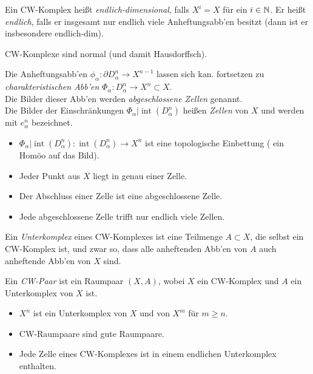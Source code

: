 \documentclass{cheat-sheet}
\DeclareMathOperator{\inte}{int} %
\begin{document}
\begin{defn}
  Ein CW-Komplex heißt \emph{endlich-dimensional}, falls $X^i = X$ für ein $i \in \mathbb{N}$. Er heißt \emph{endlich}, falls er insgesamt nur endlich viele Anheftungsabb'en besitzt (dann ist er insbesondere endlich-dim).
\end{defn}

\begin{prop}
  CW-Komplexe sind normal (und damit Hausdorffsch).
\end{prop}

\begin{defn}
  Die Anheftungsabb'en $\phi_\alpha : \partial D^{n}_\alpha \to X^{n-1}$ lassen sich kan. fortsetzen zu \emph{charakteristischen Abb'en} $\Phi_\alpha : D^n_\alpha \to X^n \subset X$.\\
  Die Bilder dieser Abb'en werden \emph{abgeschlossene Zellen} genannt.\\
  Die Bilder der Einschränkungen $\Phi_\alpha|\inte(D^n_\alpha)$ heißen \emph{Zellen} von $X$ und werden mit $e^n_\alpha$ bezeichnet.
\end{defn}

\begin{prop}
  \begin{itemize}
    \item $\Phi_\alpha|\inte(D^n_\alpha) : \inte(D^n_\alpha) \to X^n$  ist eine topologische Einbettung (\dh{} ein Homöo auf das Bild).
    \item Jeder Punkt aus $X$ liegt in genau einer Zelle.
    \item Der Abschluss einer Zelle ist eine abgeschlossene Zelle.
    \item Jede abgeschlossene Zelle trifft nur endlich viele Zellen.
  \end{itemize}
\end{prop}


\begin{defn}
  Ein \emph{Unterkomplex} eines CW-Komplexes ist eine Teilmenge $A \subset X$, die selbst ein CW-Komplex ist, und zwar so, dass alle anheftenden Abb'en von $A$ auch anheftende Abb'en von $X$ sind.
\end{defn}

\begin{defn}
  Ein \emph{CW-Paar} ist ein Raumpaar $(X, A)$, wobei $X$ ein CW-Komplex und $A$ ein Unterkomplex von $X$ ist.
\end{defn}

\begin{prop}
  \begin{itemize}
    \item $X^n$ ist ein Unterkomplex von $X$ und von $X^m$ für $m \geq n$.
    \item CW-Raumpaare sind gute Raumpaare.
    \item Jede Zelle eines CW-Komplexes ist in einem endlichen Unterkomplex enthalten.
  \end{itemize}
\end{prop}
\end{document}
